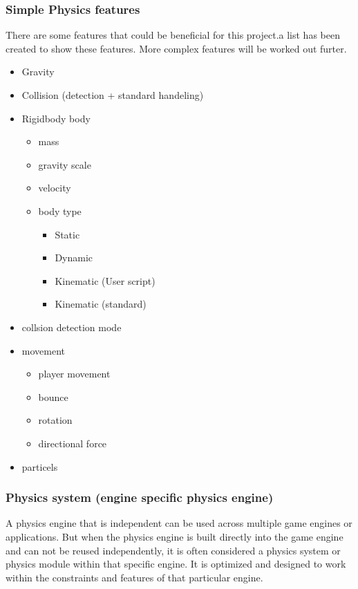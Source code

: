 \documentclass{projdoc}
\begin{document}
\subsubsection{Simple Physics features}

There are some features that could be beneficial for this project.a list has been created to show these features. More complex features will be worked out furter.

\begin{itemize}
    \item Gravity
    \item Collision (detection + standard handeling)
    \item Rigidbody body
    \begin{itemize}
		\item mass
		\item gravity scale
		\item velocity
		\item body type
		\begin{itemize}
			\item Static
			\item Dynamic
			\item Kinematic (User script)
			\item Kinematic (standard)
		\end{itemize}
	\end{itemize}
	\item collsion detection mode
    \item movement
    \begin{itemize}
		\item player movement
		\item bounce
		\item rotation
		\item directional force
	\end{itemize}
	\item particels
\end{itemize}

\subsubsection{Physics system (engine specific physics engine)}
A physics engine that is independent can be used across multiple game engines or applications. But when the physics engine is built directly into the game engine and can not be reused independently, it is often considered a physics system or physics module within that specific engine. It is optimized and designed to work within the constraints and features of that particular engine.
\end{document}
